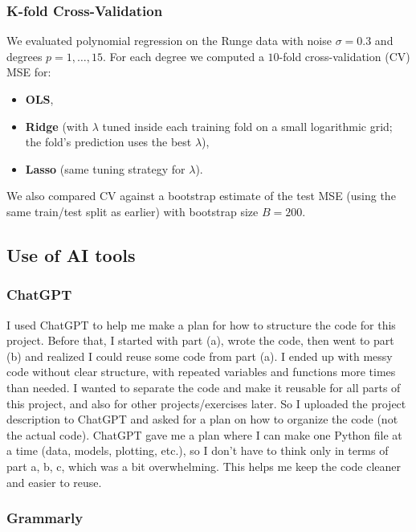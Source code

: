 \documentclass[amssymb,twocolumn,aps]{revtex4-2}
\begin{document}
\subsubsection{K-fold Cross-Validation}

We evaluated polynomial regression on the Runge data with noise $\sigma=0.3$ and degrees $p=1,\dots,15$.
For each degree we computed a $10$-fold cross-validation (CV) MSE for:
\begin{itemize}
    \item \textbf{OLS},
    \item \textbf{Ridge} (with $\lambda$ tuned inside each training fold on a small logarithmic grid; the fold’s prediction uses the best $\lambda$),
    \item \textbf{Lasso} (same tuning strategy for $\lambda$).
\end{itemize}
We also compared CV against a bootstrap estimate of the test MSE (using the same train/test split as earlier) with bootstrap size $B=200$.


\subsection{Use of AI tools}
 \label{subsubsec:ai_method}
	
\subsubsection{ChatGPT}
I used ChatGPT to help me make a plan for how to structure the code for this project. Before that, I started with part (a), wrote the code, then went to part (b) and realized I could reuse some code from part (a). I ended up with messy code without clear structure, with repeated variables and functions more times than needed. I wanted to separate the code and make it reusable for all parts of this project, and also for other projects/exercises later. So I uploaded the project description to ChatGPT and asked for a plan on how to organize the code (not the actual code). ChatGPT gave me a plan where I can make one Python file at a time (data, models, plotting, etc.), so I don’t have to think only in terms of part a, b, c, which was a bit overwhelming. This helps me keep the code cleaner and easier to reuse. \\

\subsubsection{Grammarly}
\end{document}
